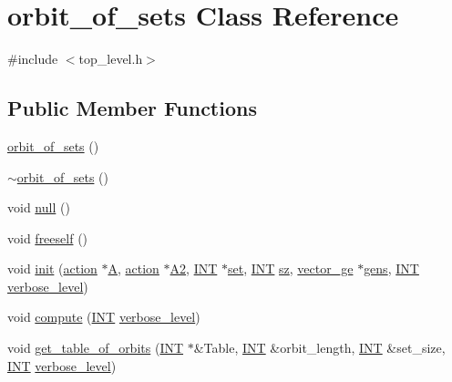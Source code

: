 \hypertarget{classorbit__of__sets}{}\section{orbit\+\_\+of\+\_\+sets Class Reference}
\label{classorbit__of__sets}


{\ttfamily \#include $<$top\+\_\+level.\+h$>$}

\subsection*{Public Member Functions}
\begin{DoxyCompactItemize}
\item 
\mbox{\hyperlink{classorbit__of__sets_aca8dee06bc730f4a3b0ef5f96747cc38}{orbit\+\_\+of\+\_\+sets}} ()
\item 
\mbox{\hyperlink{classorbit__of__sets_afe9fd5379897cac2fa24a1e887250b29}{$\sim$orbit\+\_\+of\+\_\+sets}} ()
\item 
void \mbox{\hyperlink{classorbit__of__sets_a215cd3b2386ca2d4bda2e2cb9a9a04ff}{null}} ()
\item 
void \mbox{\hyperlink{classorbit__of__sets_ac6693562d7a5f19aa3cedba4ca6c5414}{freeself}} ()
\item 
void \mbox{\hyperlink{classorbit__of__sets_a83ca294d6cb9bc87c0d3dd3f0873f240}{init}} (\mbox{\hyperlink{classaction}{action}} $\ast$\mbox{\hyperlink{classorbit__of__sets_ae6f3ca2a2cd1c8166ec4addaba4612c6}{A}}, \mbox{\hyperlink{classaction}{action}} $\ast$\mbox{\hyperlink{classorbit__of__sets_a3f546125b2bbc0c95d34ede32bc2b62f}{A2}}, \mbox{\hyperlink{galois_8h_a09fddde158a3a20bd2dcadb609de11dc}{I\+NT}} $\ast$\mbox{\hyperlink{nauty_8h_a9690bea211101f22a5e154087590c3da}{set}}, \mbox{\hyperlink{galois_8h_a09fddde158a3a20bd2dcadb609de11dc}{I\+NT}} \mbox{\hyperlink{classorbit__of__sets_a8b823e6f6f88c55c84bf1a1449f383ed}{sz}}, \mbox{\hyperlink{classvector__ge}{vector\+\_\+ge}} $\ast$\mbox{\hyperlink{classorbit__of__sets_a20541d9a8d95cd3c60e667904823185b}{gens}}, \mbox{\hyperlink{galois_8h_a09fddde158a3a20bd2dcadb609de11dc}{I\+NT}} \mbox{\hyperlink{simeon_8_c_a818073fbcc2f439e7c56952f67386122}{verbose\+\_\+level}})
\item 
void \mbox{\hyperlink{classorbit__of__sets_a10a9635a3d0dc263453c667f5f44af54}{compute}} (\mbox{\hyperlink{galois_8h_a09fddde158a3a20bd2dcadb609de11dc}{I\+NT}} \mbox{\hyperlink{simeon_8_c_a818073fbcc2f439e7c56952f67386122}{verbose\+\_\+level}})
\item 
void \mbox{\hyperlink{classorbit__of__sets_a9b124cb1300665f7d4328368b02e142e}{get\+\_\+table\+\_\+of\+\_\+orbits}} (\mbox{\hyperlink{galois_8h_a09fddde158a3a20bd2dcadb609de11dc}{I\+NT}} $\ast$\&Table, \mbox{\hyperlink{galois_8h_a09fddde158a3a20bd2dcadb609de11dc}{I\+NT}} \&orbit\+\_\+length, \mbox{\hyperlink{galois_8h_a09fddde158a3a20bd2dcadb609de11dc}{I\+NT}} \&set\+\_\+size, \mbox{\hyperlink{galois_8h_a09fddde158a3a20bd2dcadb609de11dc}{I\+NT}} \mbox{\hyperlink{simeon_8_c_a818073fbcc2f439e7c56952f67386122}{verbose\+\_\+level}})
\end{DoxyCompactItemize}
